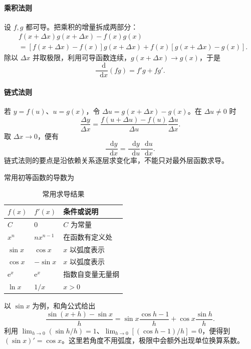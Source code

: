 \documentclass[UTF8,zihao=-4,oneside,openany]{ctexbook}
\numberwithin{equation}{section}
\newcommand{\dd}{\mathop{}\!\mathrm{d}}
\newcommand{\e}{\mathrm e}
\begin{document}
\paragraph{乘积法则}
设 $f,g$ 都可导。把乘积的增量拆成两部分：
\begin{align*}
  &f(x+\Delta x)g(x+\Delta x)-f(x)g(x)\\
  &=[f(x+\Delta x)-f(x)]g(x+\Delta x)
   +f(x)[g(x+\Delta x)-g(x)].
\end{align*}
除以 $\Delta x$ 并取极限，利用可导函数连续，$g(x+\Delta x)\to g(x)$，于是
\begin{equation}
  \frac{\dd}{\dd x}(fg)=f'g+fg'.
  \label{eq:product-rule}
\end{equation}

\paragraph{链式法则}
若 $y=f(u)$、$u=g(x)$，令 $\Delta u=g(x+\Delta x)-g(x)$。在 $\Delta u\ne0$ 时
\[
  \frac{\Delta y}{\Delta x}
  =\frac{f(u+\Delta u)-f(u)}{\Delta u}
   \frac{\Delta u}{\Delta x}.
\]
取 $\Delta x\to0$，便有
\begin{equation}
  \frac{\dd y}{\dd x}
  =\frac{\dd y}{\dd u}\frac{\dd u}{\dd x}.
  \label{eq:chain-rule}
\end{equation}
链式法则的要点是沿依赖关系逐层求变化率，不能只对最外层函数求导。

常用初等函数的导数为
\begin{table}[htbp]
\centering
\caption{常用求导结果}
\begin{tabularx}{0.88\textwidth}{>{\centering\arraybackslash}X >{\centering\arraybackslash}X >{\centering\arraybackslash}X}
\toprule
$f(x)$ & $f'(x)$ & 条件或说明 \\
\midrule
$C$ & $0$ & $C$ 为常量 \\
$x^n$ & $nx^{n-1}$ & 在函数有定义处 \\
$\sin x$ & $\cos x$ & $x$ 以弧度表示 \\
$\cos x$ & $-\sin x$ & $x$ 以弧度表示 \\
$\e^x$ & $\e^x$ & 指数自变量无量纲 \\
$\ln x$ & $1/x$ & $x>0$ \\
\bottomrule
\end{tabularx}
\end{table}

以 $\sin x$ 为例，和角公式给出
\[
  \frac{\sin(x+h)-\sin x}{h}
  =\sin x\frac{\cos h-1}{h}+\cos x\frac{\sin h}{h}.
\]
利用 $\lim_{h\to0}(\sin h/h)=1$、$\lim_{h\to0}[(\cos h-1)/h]=0$，便得到
$(\sin x)'=\cos x$。这里若角度不用弧度，极限中会额外出现单位换算系数。
\end{document}
